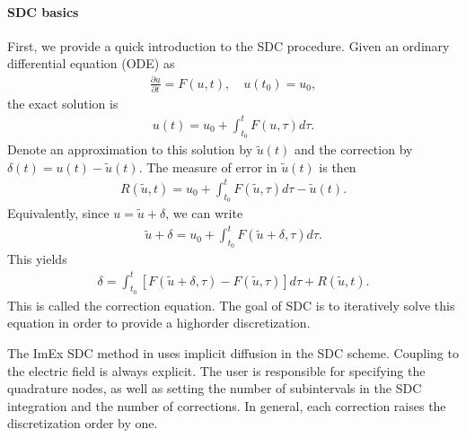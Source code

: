 \documentclass[letterpaper,10pt,english]{sphinxmanual}
\begin{document}
\paragraph{SDC basics}
\label{\detokenize{Applications/CdrPlasmaModel:sdc-basics}}
\sphinxAtStartPar
First, we provide a quick introduction to the SDC procedure.
Given an ordinary differential equation (ODE) as
\begin{equation*}
\begin{split}\frac{\partial u}{\partial t} = F(u,t), \quad u(t_0) = u_0,\end{split}
\end{equation*}
\sphinxAtStartPar
the exact solution is
\begin{equation*}
\begin{split}u(t) = u_0 + \int_{t_0}^tF\left(u,\tau\right)d\tau.\end{split}
\end{equation*}
\sphinxAtStartPar
Denote an approximation to this solution by \(\widetilde{u}(t)\) and the correction by \(\delta(t) = u(t) - \widetilde{u}(t)\). The measure of error in \(\widetilde{u}(t)\) is then
\begin{equation*}
\begin{split}R(\widetilde{u}, t) = u_0 + \int_{t_0}^tF(\widetilde{u}, \tau)d\tau - \widetilde{u}(t).\end{split}
\end{equation*}
\sphinxAtStartPar
Equivalently, since \(u = \widetilde{u} + \delta\), we can write
\begin{equation*}
\begin{split}\widetilde{u} + \delta = u_0 + \int_{t_0}^t F\left(\widetilde{u}+\delta, \tau\right)d\tau.\end{split}
\end{equation*}
\sphinxAtStartPar
This yields
\begin{equation*}
\begin{split}\delta = \int_{t_0}^t\left[F\left(\widetilde{u}+\delta, \tau\right) - F\left(\widetilde{u}, \tau\right)\right]d\tau + R\left(\widetilde{u},t\right).\end{split}
\end{equation*}
\sphinxAtStartPar
This is called the correction equation. The goal of SDC is to iteratively solve this equation in order to provide a high\sphinxhyphen{}order discretization.

\sphinxAtStartPar
The ImEx SDC method in  uses implicit diffusion in the SDC scheme.
Coupling to the electric field is always explicit.
The user is responsible for specifying the quadrature nodes, as well as setting the number of sub\sphinxhyphen{}intervals in the SDC integration and the number of corrections.
In general, each correction raises the discretization order by one.
\end{document}
